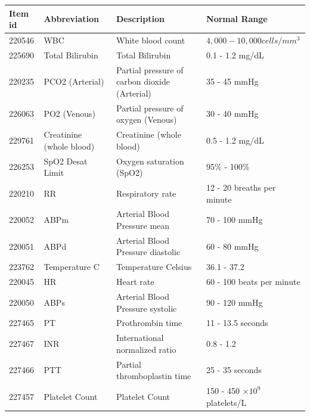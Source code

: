 \documentclass{article} %
\begin{document}
%
%
%
\begin{table}[h!]
\small  %
\setlength{\tabcolsep}{4pt}  %
\centering
\begin{tabular}{l|l|l|l}
\toprule
\textbf{Item id} & \textbf{Abbreviation}    & \textbf{Description} & \textbf{Normal Range}                               \\ \midrule
220546           & WBC                      & White blood count  &  $4,000 - 10,000 cells/mm^{3}$                               \\ \hline
225690           & Total Bilirubin          &  Total Bilirubin   &   0.1 - 1.2 mg/dL                                              \\ \hline
220235           & PCO2 (Arterial)          &  Partial pressure of carbon dioxide (Arterial)    &   35 - 45 mmHg               \\ \hline
226063           & PO2 (Venous)             &  Partial pressure of oxygen (Venous)    &   30 - 40 mmHg                              \\ \hline
229761           & Creatinine (whole blood) &   Creatinine (whole blood)     &    0.5 - 1.2 mg/dL                                         \\ \hline
226253           & SpO2 Desat Limit         & Oxygen saturation (SpO2)    &      95\% - 100\%                                          \\ \hline
220210           & RR                       & Respiratory rate              &  12 - 20 breaths per minute                    \\ \hline
220052           & ABPm                     & Arterial Blood Pressure mean  &70 - 100 mmHg \\ \hline
220051           & ABPd                     & Arterial Blood Pressure diastolic  &  60 - 80 mmHg               \\ \hline
223762           & Temperature C            & Temperature Celsius                 &   36.1 - 37.2                              \\ \hline
220045           & HR                       & Heart rate                           &  60 - 100 beats per minute             \\ \hline
220050           & ABPs                     & Arterial Blood Pressure systolic      &  90 - 120 mmHg            \\ \hline
227465           & PT                       & Prothrombin time                      & 11 - 13.5 seconds             \\ \hline
227467           & INR                      & International normalized ratio        &  0.8 - 1.2             \\ \hline
227466           & PTT                      & Partial thromboplastin time           &  25 - 35 seconds            \\ \hline
227457           & Platelet Count           & Platelet Count                        & 150 - 450 $\times 10^{9}$ platelets/L                           \\ \bottomrule




\end{tabular}
\end{table}
\end{document}
